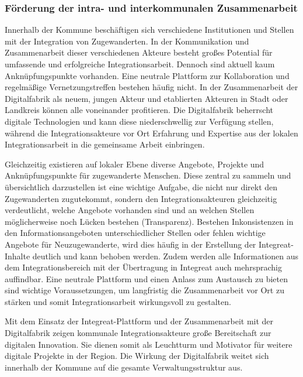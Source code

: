 \documentclass[12pt, a4paper]{article} %
\begin{document}
\hypertarget{fuxf6rderung-der-intra--und-interkommunalen-zusammenarbeit}{%
\subsubsection{Förderung der intra- und interkommunalen
Zusammenarbeit}\label{fuxf6rderung-der-intra--und-interkommunalen-zusammenarbeit}}

Innerhalb der Kommune beschäftigen sich verschiedene Institutionen und
Stellen mit der Integration von Zugewanderten. In der Kommunikation und
Zusammenarbeit dieser verschiedenen Akteure besteht großes Potential für
umfassende und erfolgreiche Integrationsarbeit. Dennoch sind aktuell
kaum Anknüpfungspunkte vorhanden. Eine neutrale Plattform zur
Kollaboration und regelmäßige Vernetzungstreffen bestehen häufig nicht.
In der Zusammenarbeit der Digitalfabrik als neuem, jungen Akteur und
etablierten Akteuren in Stadt oder Landkreis können alle voneinander
profitieren. Die Digitalfabrik beherrscht digitale Technologien und kann
diese niederschwellig zur Verfügung stellen, während die
Integrationsakteure vor Ort Erfahrung und Expertise aus der lokalen
Integrationsarbeit in die gemeinsame Arbeit einbringen.

Gleichzeitig existieren auf lokaler Ebene diverse Angebote, Projekte und
Anknüpfungspunkte für zugewanderte Menschen. Diese zentral zu sammeln
und übersichtlich darzustellen ist eine wichtige Aufgabe, die nicht nur
direkt den Zugewanderten zugutekommt, sondern den Integrationsakteuren
gleichzeitig verdeutlicht, welche Angebote vorhanden sind und an welchen
Stellen möglicherweise noch Lücken bestehen (Transparenz). Bestehen
Inkonsistenzen in den Informationsangeboten unterschiedlicher Stellen
oder fehlen wichtige Angebote für Neuzugewanderte, wird dies häufig in
der Erstellung der Integreat-Inhalte deutlich und kann behoben werden.
Zudem werden alle Informationen aus dem Integrationsbereich mit der
Übertragung in Integreat auch mehrsprachig auffindbar. Eine neutrale
Plattform und einen Anlass zum Austausch zu bieten sind wichtige
Voraussetzungen, um langfristig die Zusammenarbeit vor Ort zu stärken
und somit Integrationsarbeit wirkungsvoll zu gestalten.

Mit dem Einsatz der Integreat-Plattform und der Zusammenarbeit mit der
Digitalfabrik zeigen kommunale Integrationsakteure große Bereitschaft
zur digitalen Innovation. Sie dienen somit als Leuchtturm und Motivator
für weitere digitale Projekte in der Region. Die Wirkung der
Digitalfabrik weitet sich innerhalb der Kommune auf die gesamte
Verwaltungsstruktur aus.
\end{document}
